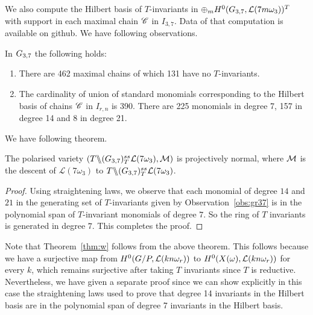 We also compute the Hilbert basis of $T$-invariants in $\oplus_m H^0(G_{{3},{7}}, {\cal L}(7m\omega_3))^T$ with support in each maximal chain $\mathscr{C}$ in $I_{3,7}$.
Data of that computation is available on github. We have following observations. 
\begin{observation}
\label{obs:gr37}
In $G_{{3},{7}}$ the following holds:
\begin{enumerate}
\item There are 462 maximal chains of which 131 have no $T$-invariants.
\item The cardinality of union of standard monomials corresponding to the Hilbert basis of chains $\mathscr{C}$ in $I_{r,n}$ is 390. There are 225 monomials in degree 7, 157 in degree 14 and 8 in degree 21.
\end{enumerate}
\end{observation}
  We have following theorem. 
\begin{theorem}
    The polarised variety \((T \backslash\mkern-6mu\backslash (G_{{3},{7}})^{ss}_T{\cal L}(7\omega_3),{\cal M})\) is projectively normal, where \(\cal M\) is the descent of \({\mathcal L}(7\omega_3)\) to \(T \backslash\mkern-6mu\backslash (G_{{3},{7}})^{ss}_T{\cal L}(7\omega_3)\).
\end{theorem}
\begin{proof}
Using straightening laws, we observe that each monomial of degree \(14\) and \(21\) in the generating set of $T$-invariants given by Observation~\ref{obs:gr37} is in the polynomial span of  $T$-invariant monomials  of degree \(7\). So the ring of $T$ invariants is generated in degree $7$. This completes the proof.
\end{proof}

Note that Theorem~\ref{thm:w} follows from the above theorem. This follows because we have a surjective map from $H^0(G/P, {\cal L}(kn\omega_r))$ to 
$H^0(X(\omega), {\cal L}(kn\omega_r))$ for every $k$, which remains surjective after taking $T$ invariants since $T$ is reductive. Nevertheless, we have given a separate proof since 
we can show explicitly in this case the straightening laws used to prove that degree 14 invariants in the Hilbert basis are in the polynomial span of degree 7 invariants in the Hilbert basis.
 
